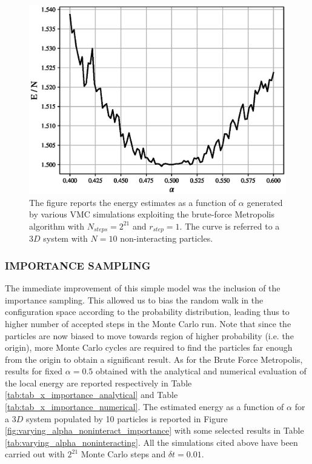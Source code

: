 \begin{figure}[H]
    \centering
    \includegraphics[scale=0.5]{images/varying_alpha_noninteract.eps}
    \caption{The figure reports the energy estimates as a function of $\alpha$ generated by various VMC simulations exploiting the brute-force Metropolis algorithm with $N_{steps}=2^{21}$ and $r_{step}=1$. The curve is referred to a $3D$ system with $N=10$ non-interacting particles. }
    \label{fig:varying_alpha_noninteract_metropolis}
\end{figure}


\subsubsection{IMPORTANCE SAMPLING}
The immediate improvement of this simple model was the inclusion of the importance sampling. This allowed us to bias the random walk in the configuration space according to the probability distribution, leading thus to higher number of accepted steps in the Monte Carlo run. Note that since the particles are now biased to move towards region of higher probability (i.e. the origin), more Monte Carlo cycles are required to find the particles far enough from the origin to obtain a significant result. As for the Brute Force Metropolis, results for fixed $\alpha=0.5$ obtained with the analytical and numerical evaluation of the local energy are reported respectively in Table \ref{tab:tab_x_importance_analytical} and Table \ref{tab:tab_x_importance_numerical}. The estimated energy as a function of $\alpha$ for a $3D$ system populated by 10 particles is reported in Figure \ref{fig:varying_alpha_noninteract_importance} with some selected results in Table \ref{tab:varying_alpha_noninteracting}. All the simulations cited above have been carried out with $2^{21}$ Monte Carlo steps and $\delta t = 0.01$.


